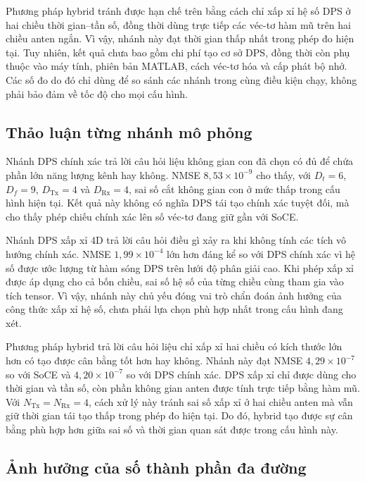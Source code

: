 Phương pháp hybrid tránh được hạn chế trên bằng cách chỉ xấp xỉ hệ số DPS ở hai chiều thời gian--tần số, đồng thời dùng trực tiếp các véc-tơ hàm mũ trên hai chiều anten ngắn. Vì vậy, nhánh này đạt thời gian thấp nhất trong phép đo hiện tại. Tuy nhiên, kết quả chưa bao gồm chi phí tạo cơ sở DPS, đồng thời còn phụ thuộc vào máy tính, phiên bản MATLAB, cách véc-tơ hóa và cấp phát bộ nhớ. Các số đo do đó chỉ dùng để so sánh các nhánh trong cùng điều kiện chạy, không phải bảo đảm về tốc độ cho mọi cấu hình.

\subsection{Thảo luận từng nhánh mô phỏng}
\label{subsec:ch4_branch_discussion}

Nhánh DPS chính xác trả lời câu hỏi liệu không gian con đã chọn có đủ để chứa phần lớn năng lượng kênh hay không. NMSE \(8{,}53\times10^{-9}\) cho thấy, với \(D_t=6\), \(D_f=9\), \(D_{\mathrm{Tx}}=4\) và \(D_{\mathrm{Rx}}=4\), sai số cắt không gian con ở mức thấp trong cấu hình hiện tại. Kết quả này không có nghĩa DPS tái tạo chính xác tuyệt đối, mà cho thấy phép chiếu chính xác lên số véc-tơ đang giữ gần với SoCE.

Nhánh DPS xấp xỉ 4D trả lời câu hỏi điều gì xảy ra khi không tính các tích vô hướng chính xác. NMSE \(1{,}99\times10^{-4}\) lớn hơn đáng kể so với DPS chính xác vì hệ số được ước lượng từ hàm sóng DPS trên lưới độ phân giải cao. Khi phép xấp xỉ được áp dụng cho cả bốn chiều, sai số hệ số của từng chiều cùng tham gia vào tích tensor. Vì vậy, nhánh này chủ yếu đóng vai trò chẩn đoán ảnh hưởng của công thức xấp xỉ hệ số, chưa phải lựa chọn phù hợp nhất trong cấu hình đang xét.

Phương pháp hybrid trả lời câu hỏi liệu chỉ xấp xỉ hai chiều có kích thước lớn hơn có tạo được cân bằng tốt hơn hay không. Nhánh này đạt NMSE \(4{,}29\times10^{-7}\) so với SoCE và \(4{,}20\times10^{-7}\) so với DPS chính xác. DPS xấp xỉ chỉ được dùng cho thời gian và tần số, còn phần không gian anten được tính trực tiếp bằng hàm mũ. Với \(N_{\mathrm{Tx}}=N_{\mathrm{Rx}}=4\), cách xử lý này tránh sai số xấp xỉ ở hai chiều anten mà vẫn giữ thời gian tái tạo thấp trong phép đo hiện tại. Do đó, hybrid tạo được sự cân bằng phù hợp hơn giữa sai số và thời gian quan sát được trong cấu hình này.

\subsection{Ảnh hưởng của số thành phần đa đường}
\label{subsec:ch4_p_sweep}

